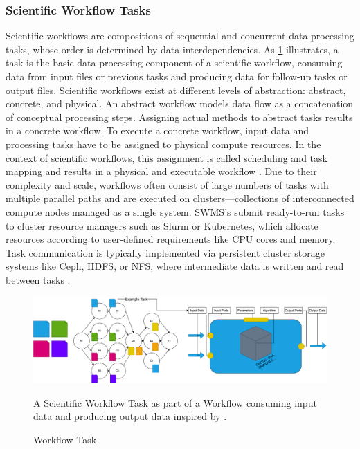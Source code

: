 \subsubsection{Scientific Workflow Tasks}
\label{sec:background_workflows_examples}
Scientific workflows are compositions of sequential and concurrent data processing tasks, whose order is determined by data interdependencies. As \ref{fig:02-workflow-task} illustrates, a task is the basic data processing component of a scientific workflow, consuming data from input files or previous tasks and producing data for follow-up tasks or output files. Scientific workflows exist at different levels of abstraction: abstract, concrete, and physical. An abstract workflow models data flow as a concatenation of conceptual processing steps. Assigning actual methods to abstract tasks results in a concrete workflow. To execute a concrete workflow, input data and processing tasks have to be assigned to physical compute resources. In the context of scientific workflows, this assignment is called scheduling and task mapping and results in a physical and executable workflow \cite{Bux2013} \cite{Witzke2024}.
Due to their complexity and scale, workflows often consist of large numbers of tasks with multiple parallel paths and are executed on clusters—collections of interconnected compute nodes managed as a single system. SWMS's submit ready-to-run tasks to cluster resource managers such as Slurm or Kubernetes, which allocate resources according to user-defined requirements like CPU cores and memory. Task communication is typically implemented via persistent cluster storage systems like Ceph, HDFS, or NFS, where intermediate data is written and read between tasks \cite{thamsen2025energyawareworkflowexecutionoverview}.

\begin{figure}[H]
    \centering
    \includegraphics[scale=0.4]{fig/02/02-workflow-task.pdf}
    \small
    \caption{Workflow Task}
    \label{fig:02-workflow-task}
    \tiny
    A Scientific Workflow Task as part of a Workflow consuming input data and producing output data inspired by \cite{Bux2013}.
\end{figure}

